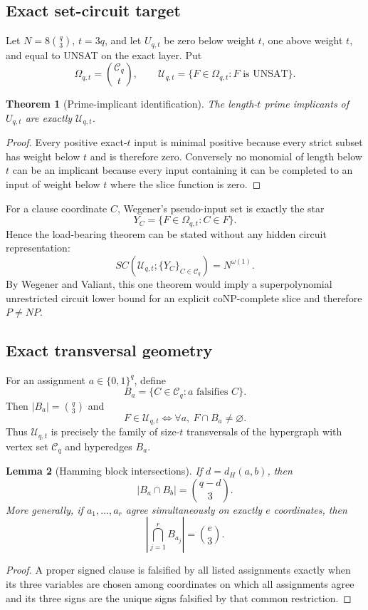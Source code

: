 \documentclass[11pt]{article}
\newtheorem{theorem}{Theorem}
\newtheorem{lemma}[theorem]{Lemma}
\begin{document}
\subsection{Exact set-circuit target}
Let $N=8\binom q3$, $t=3q$, and let $U_{q,t}$ be zero below weight $t$, one above weight $t$, and equal to UNSAT on the exact layer. Put
\[\Omega_{q,t}=\binom{\mathcal C_q}{t},\qquad \mathcal U_{q,t}=\{F\in\Omega_{q,t}:F\text{ is UNSAT}\}.\]

\begin{theorem}[Prime-implicant identification]
The length-$t$ prime implicants of $U_{q,t}$ are exactly $\mathcal U_{q,t}$.
\end{theorem}
\begin{proof}
Every positive exact-$t$ input is minimal positive because every strict subset has weight below $t$ and is therefore zero. Conversely no monomial of length below $t$ can be an implicant because every input containing it can be completed to an input of weight below $t$ where the slice function is zero.
\end{proof}

For a clause coordinate $C$, Wegener's pseudo-input set is exactly the star
\[Y_C=\{F\in\Omega_{q,t}:C\in F\}.\]
Hence the load-bearing theorem can be stated without any hidden circuit representation:
\[\boxed{SC(\mathcal U_{q,t};\{Y_C\}_{C\in\mathcal C_q})=N^{\omega(1)}.}\]
By Wegener and Valiant, this one theorem would imply a superpolynomial unrestricted circuit lower bound for an explicit coNP-complete slice and therefore $P\ne NP$.

\subsection{Exact transversal geometry}
For an assignment $a\in\{0,1\}^q$, define
\[B_a=\{C\in\mathcal C_q:a\text{ falsifies }C\}.\]
Then $|B_a|=\binom q3$ and
\[F\in\mathcal U_{q,t}\iff \forall a,\ F\cap B_a\ne\varnothing.\]
Thus $\mathcal U_{q,t}$ is precisely the family of size-$t$ transversals of the hypergraph with vertex set $\mathcal C_q$ and hyperedges $B_a$.

\begin{lemma}[Hamming block intersections]
If $d=d_H(a,b)$, then
\[|B_a\cap B_b|=\binom{q-d}{3}.\]
More generally, if $a_1,\ldots,a_r$ agree simultaneously on exactly $e$ coordinates, then
\[\left|\bigcap_{j=1}^r B_{a_j}\right|=\binom e3.\]
\end{lemma}
\begin{proof}
A proper signed clause is falsified by all listed assignments exactly when its three variables are chosen among coordinates on which all assignments agree and its three signs are the unique signs falsified by that common restriction.
\end{proof}
\end{document}
